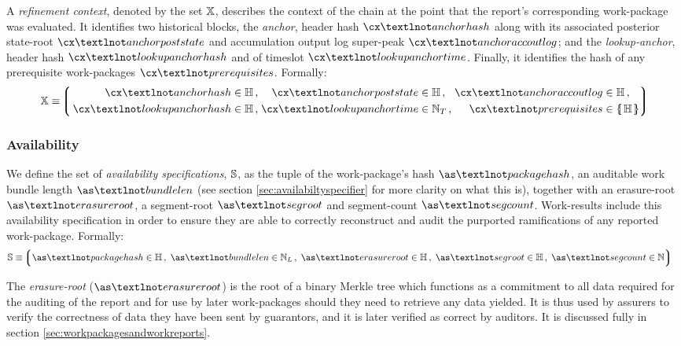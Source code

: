 A \emph{refinement context}, denoted by the set $\mathbb{X}$, describes the context of the chain at the point that the report's corresponding work-package was evaluated. It identifies two historical blocks, the \emph{anchor}, header hash $\cx¬anchorhash$ along with its associated posterior state-root $\cx¬anchorpoststate$ and accumulation output log super-peak $\cx¬anchoraccoutlog$; and the \emph{lookup-anchor}, header hash $\cx¬lookupanchorhash$ and of timeslot $\cx¬lookupanchortime$. Finally, it identifies the hash of any prerequisite work-packages $\cx¬prerequisites$. Formally:
\begin{equation}
  \workcontext \equiv \tuple{\,\begin{alignedat}{5}
    \isa{\cx¬anchorhash&}{\hash}\,,\;
    \isa{&\cx¬anchorpoststate&}{\hash}\,,\;
    \isa{&\cx¬anchoraccoutlog&}{\hash}\,,\;\\
    \isa{\cx¬lookupanchorhash&}{\hash}\,,\;
    \isa{&\cx¬lookupanchortime&}{\timeslot}\,,\;
    \isa{&\cx¬prerequisites&}{\protoset{\hash}}
  \end{alignedat}}
\end{equation}

\subsubsection{Availability}
We define the set of \emph{availability specifications}, $\mathbb{S}$, as the tuple of the work-package's hash $\as¬packagehash$, an auditable work bundle length $\as¬bundlelen$ (see section \ref{sec:availabiltyspecifier} for more clarity on what this is), together with an erasure-root $\as¬erasureroot$, a segment-root $\as¬segroot$ and segment-count $\as¬segcount$. Work-results include this availability specification in order to ensure they are able to correctly reconstruct and audit the purported ramifications of any reported work-package. Formally:
\begin{align}
  \avspec &\equiv \tuple{
    \isa{\as¬packagehash}{\hash}\,,\;
    \isa{\as¬bundlelen}{\bloblength}\,,\;
    \isa{\as¬erasureroot}{\hash}\,,\;
    \isa{\as¬segroot}{\hash}\,,\;
    \isa{\as¬segcount}{\N}
  }
\end{align}

The \emph{erasure-root} ($\as¬erasureroot$) is the root of a binary Merkle tree which functions as a commitment to all data required for the auditing of the report and for use by later work-packages should they need to retrieve any data yielded. It is thus used by assurers to verify the correctness of data they have been sent by guarantors, and it is later verified as correct by auditors. It is discussed fully in section \ref{sec:workpackagesandworkreports}.

